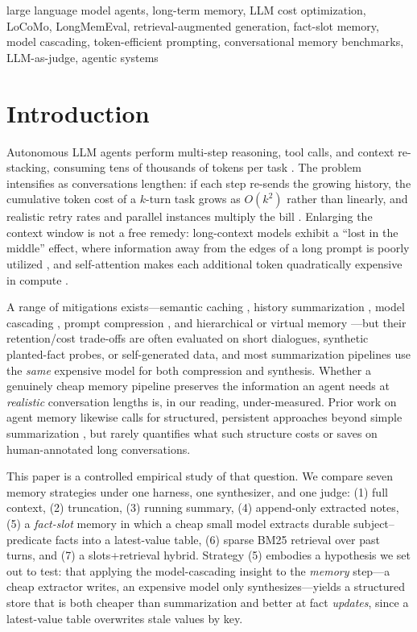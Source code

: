 \documentclass[conference]{IEEEtran}
\begin{document}
\begin{IEEEkeywords}
large language model agents, long-term memory, LLM cost optimization, LoCoMo, LongMemEval, retrieval-augmented generation, fact-slot memory, model cascading, token-efficient prompting, conversational memory benchmarks, LLM-as-judge, agentic systems
\end{IEEEkeywords}

\section{Introduction}

Autonomous LLM agents perform multi-step reasoning, tool calls, and context re-stacking, consuming tens of thousands of tokens per task \cite{zhou2024agents, park2023generative}. The problem intensifies as conversations lengthen: if each step re-sends the growing history, the cumulative token cost of a $k$-turn task grows as $O(k^2)$ rather than linearly, and realistic retry rates and parallel instances multiply the bill \cite{shinn2023reflexion}. Enlarging the context window is not a free remedy: long-context models exhibit a ``lost in the middle'' effect, where information away from the edges of a long prompt is poorly utilized \cite{nfliu2023lost}, and self-attention makes each additional token quadratically expensive in compute \cite{packer2023memgpt}.

A range of mitigations exists---semantic caching \cite{bang2023gptcache}, history summarization \cite{acl2024}, model cascading \cite{chen2023frugalgpt}, prompt compression \cite{jiang2023llmlingua}, and hierarchical or virtual memory \cite{packer2023memgpt}---but their retention/cost trade-offs are often evaluated on short dialogues, synthetic planted-fact probes, or self-generated data, and most summarization pipelines use the \emph{same} expensive model for both compression and synthesis. Whether a genuinely cheap memory pipeline preserves the information an agent needs at \emph{realistic} conversation lengths is, in our reading, under-measured. Prior work on agent memory likewise calls for structured, persistent approaches beyond simple summarization \cite{park2023generative, zhong2024memorybank, zhang2024memorysurvey}, but rarely quantifies what such structure costs or saves on human-annotated long conversations.

This paper is a controlled empirical study of that question. We compare seven memory strategies under one harness, one synthesizer, and one judge: (1) full context, (2) truncation, (3) running summary, (4) append-only extracted notes, (5) a \emph{fact-slot} memory in which a cheap small model extracts durable subject--predicate facts into a latest-value table, (6) sparse BM25 retrieval over past turns, and (7) a slots+retrieval hybrid. Strategy (5) embodies a hypothesis we set out to test: that applying the model-cascading insight \cite{chen2023frugalgpt} to the \emph{memory} step---a cheap extractor writes, an expensive model only synthesizes---yields a structured store that is both cheaper than summarization and better at fact \emph{updates}, since a latest-value table overwrites stale values by key.
\end{document}
